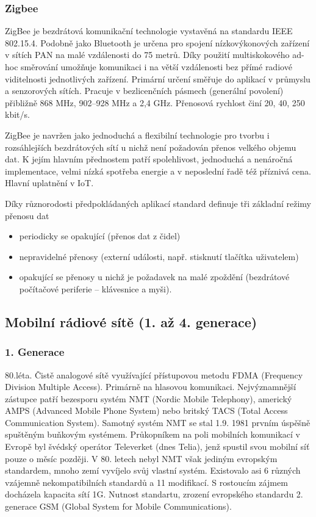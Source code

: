 \subsubsection{Zigbee}
ZigBee je bezdrátová komunikační technologie vystavěná na standardu IEEE 802.15.4. 
Podobně jako Bluetooth je určena pro spojení nízkovýkonových zařízení v sítích PAN na malé vzdálenosti do 75 metrů. Díky použití multiskokového ad-hoc směrování umožňuje komunikaci i na větší vzdálenosti bez přímé radiové viditelnosti jednotlivých zařízení. Primární určení směřuje do aplikací v průmyslu a senzorových sítích.
Pracuje v bezlicenčních pásmech (generální povolení) přibližně 868 MHz, 902–928 MHz a 2,4 GHz. Přenosová rychlost činí 20, 40, 250 kbit/s.


 ZigBee je navržen jako jednoduchá a flexibilní technologie pro tvorbu i rozsáhlejších bezdrátových sítí u nichž není požadován přenos velkého objemu dat. K jejím hlavním přednostem patří spolehlivost, jednoduchá a nenáročná implementace, velmi nízká spotřeba energie a v neposlední řadě též příznivá cena. Hlavní uplatnění v IoT.
 
Díky různorodosti předpokládaných aplikací standard definuje tři základní režimy přenosu dat
\begin{itemize}
\item periodicky se opakující (přenos dat z čidel)
\item nepravidelné přenosy (externí události, např. stisknutí tlačítka uživatelem)
\item opakující se přenosy u nichž je požadavek na malé zpoždění (bezdrátové počítačové periferie – klávesnice a myši).
\end{itemize}
\subsection{Mobilní rádiové sítě (1. až 4. generace)}
\subsubsection{1. Generace}
80.léta. Čistě analogové sítě využívající přístupovou metodu FDMA (Frequency Division Multiple Access). Primárně na hlasovou komunikaci. Nejvýznamnější zástupce patří bezesporu systém NMT (Nordic Mobile Telephony), americký AMPS (Advanced Mobile Phone System) nebo britský TACS (Total Access Communication System). 
Samotný systém NMT se stal 1.9. 1981 prvním úspěšně spuštěným buňkovým systémem. Průkopníkem na poli mobilních komunikací v Evropě byl švédský operátor Televerket (dnes Telia), jenž spustil svou mobilní síť pouze o měsíc později. V 80. letech nebyl NMT však jediným evropským standardem, mnoho zemí vyvíjelo svůj vlastní systém. Existovalo asi 6 různých vzájemně nekompatibilních standardů a 11 modifikací. S rostoucím zájmem docházela kapacita sítí 1G. Nutnost standartu, zrození evropského standardu 2. generace GSM (Global System for Mobile Communications).
